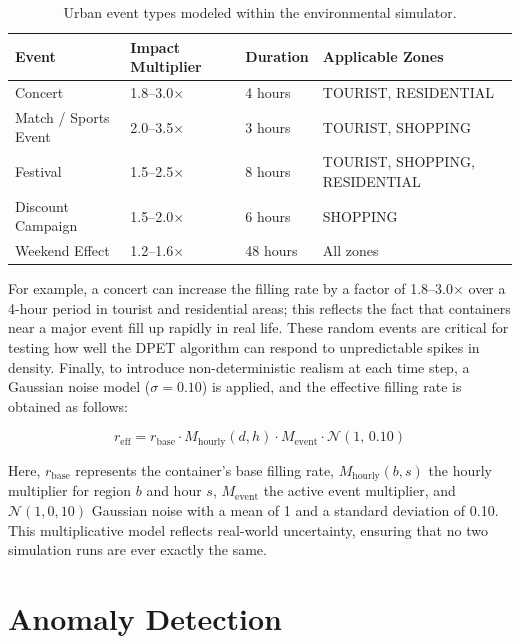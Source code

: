 \documentclass[12pt,a4paper]{report}
\begin{document}
\begin{table}[H]
\centering
\caption{Urban event types modeled within the environmental simulator.}
\label{tab:events}
\begin{tabular}{llll}
\toprule
\textbf{Event} & \textbf{Impact Multiplier} & \textbf{Duration} & \textbf{Applicable Zones} \\
\midrule
Concert   & 1.8--3.0$\times$ & 4 hours   & TOURIST, RESIDENTIAL \\
Match / Sports Event & 2.0--3.5$\times$ & 3 hours   & TOURIST, SHOPPING \\
Festival & 1.5--2.5$\times$ & 8 hours   & TOURIST, SHOPPING, RESIDENTIAL \\
Discount Campaign & 1.5--2.0$\times$ & 6 hours   & SHOPPING \\
Weekend Effect & 1.2--1.6$\times$ & 48 hours & All zones \\
\bottomrule
\end{tabular}
\end{table}

\indent For example, a concert can increase the filling rate by a factor of 1.8–3.0$\times$ over a 4-hour period in tourist and residential areas; this reflects the fact that containers near a major event fill up rapidly in real life. These random events are critical for testing how well the DPET algorithm can respond to unpredictable spikes in density. Finally, to introduce non-deterministic realism at each time step, a Gaussian noise model ($\sigma = 0.10$) is applied, and the effective filling rate is obtained as follows:

\begin{equation}
  r_{\text{eff}} = r_{\text{base}} \cdot M_{\text{hourly}}(d,h) \cdot M_{\text{event}} \cdot \mathcal{N}(1,\,0.10)
  \label{eq:eff_rate}
\end{equation}


\indent Here, $r_{\text{base}}$ represents the container’s base filling rate, $M_{\text{hourly}}(b,s)$ the hourly multiplier for region $b$ and hour $s$, $M_{\text{event}}$ the active event multiplier, and $\mathcal{N}(1,0, 10)$ Gaussian noise with a mean of 1 and a standard deviation of 0.10. This multiplicative model reflects real-world uncertainty, ensuring that no two simulation runs are ever exactly the same.

\section{Anomaly Detection}
\end{document}
